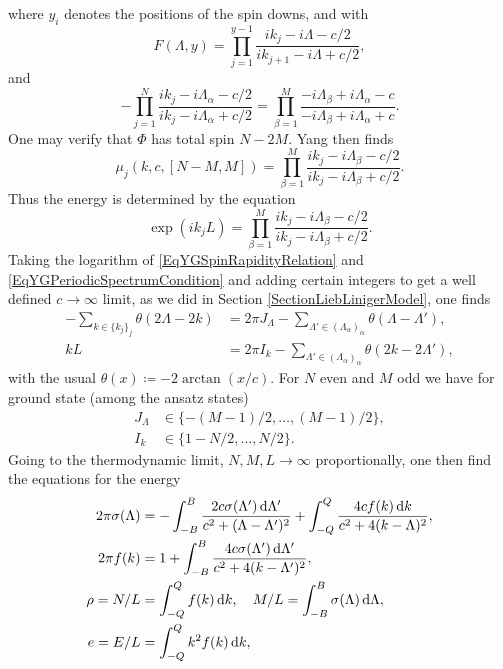 where $ y_i $ denotes the positions of the spin downs, and with \begin{equation}
F(\Lambda,y)=\prod_{j=1}^{y-1}\frac{ik_j-i\Lambda-c/2}{ik_{j+1}-i\Lambda+c/2},
\end{equation}
and \begin{equation}\label{EqYGSpinRapidityRelation}
-\prod_{j=1}^{N}\frac{ik_j-i\Lambda_\alpha-c/2}{ik_{j}-i\Lambda_\alpha+c/2}=\prod_{\beta=1}^{M}\frac{-i\Lambda_\beta+i\Lambda_\alpha-c}{-i\Lambda_\beta+i\Lambda_\alpha+c}.
\end{equation}
One may verify that $ \Phi $ has total spin $ N-2M $.
Yang then finds \begin{equation}
\mu_j(k,c,[N-M,M])=\prod_{\beta=1}^{M}\frac{ik_j-i\Lambda_\beta-c/2}{ik_j-i\Lambda_\beta+c/2}.
\end{equation}
Thus the energy is determined by the equation\begin{equation}\label{EqYGPeriodicSpectrumCondition}
\exp(ik_jL)=\prod_{\beta=1}^{M}\frac{ik_j-i\Lambda_\beta-c/2}{ik_j-i\Lambda_\beta+c/2}.
\end{equation}
Taking the logarithm of \eqref{EqYGSpinRapidityRelation} and \eqref{EqYGPeriodicSpectrumCondition} and adding certain integers to get a well defined $ c\to\infty $ limit, as we did in Section \ref{SectionLiebLinigerModel}, one finds \begin{equation}\label{EqYGintegers}
\begin{aligned}
-\sum_{k\in\{k_j\}_j}\theta(2\Lambda-2k)&=2\pi J_\Lambda-\sum_{\Lambda'\in(\Lambda_\alpha)_\alpha}\theta(\Lambda-\Lambda'),\\
kL&=2\pi I_k-\sum_{\Lambda'\in(\Lambda_\alpha)_\alpha}\theta(2k-2\Lambda'),
\end{aligned}
\end{equation}
with the usual $ \theta(x)\coloneqq-2\arctan(x/c) $. For $ N $ even and $ M $ odd we have for ground state (among the ansatz states)\begin{equation}
\begin{aligned}
J_\Lambda&\in\{-(M-1)/2,\ldots,(M-1)/2\},\\
I_k&\in \{1-N/2,\ldots,N/2\}.
\end{aligned}
\end{equation}
Going to the thermodynamic limit, \ie $ N,M,L\to\infty $ proportionally, one then find the equations for the energy \begin{align}
2\pi\sigma(\Lambda)&=-\int_{-B}^{B}\frac{2c\sigma(\Lambda')\mathop{}\!\mathrm{d} \Lambda'}{c^2+(\Lambda-\Lambda')^2}+\int_{-Q}^{Q}\frac{4c f(k)\mathop{}\!\mathrm{d} k}{c^2+4(k-\Lambda)^2}\label{EqYG1},\\
2\pi f(k) &= 1+\int_{-B}^{B}\frac{4c\sigma(\Lambda')\mathop{}\!\mathrm{d} \Lambda'}{c^2+4(k-\Lambda')^2}\label{EqYG2},\\
\rho=N/L&=\int_{-Q}^{Q} f(k) \mathop{}\!\mathrm{d} k,\quad M/L=\int_{-B}^{B}\sigma(\Lambda)\mathop{}\!\mathrm{d}\Lambda,\label{EqYG3}\\
e=E/L&=\int_{-Q}^{Q}k^2 f(k)\mathop{}\!\mathrm{d} k \label{EqYG4},
\end{align}
